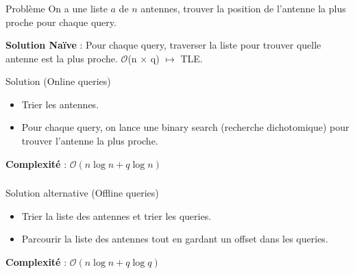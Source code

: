\begin{frame}
    \frametitle{\problemtitle}
    \begin{block}{Problème}
        On a une liste $a$ de $n$ antennes, trouver la position de l'antenne la plus proche pour chaque query.
    \end{block}
    \pause
    \textbf{Solution Naïve} : Pour chaque query, traverser la liste pour trouver quelle antenne est la plus proche.
    \pause
    $\mathcal{O}$(n $\times$ q) $\mapsto$ TLE.\\
    \pause \vspace{1em}
    \begin{block}{Solution (Online queries)}
        \begin{itemize}
            \item<+-> Trier les antennes.
            \item<+-> Pour chaque query, on lance une binary search (recherche dichotomique) pour trouver l'antenne la plus proche.
        \end{itemize}
        \pause
        \textbf{Complexité} : $\mathcal{O}(n \log n + q\log n)$
    \end{block}
\end{frame}

\begin{frame}
    \frametitle{\problemtitle}
    \begin{block}{Solution alternative (Offline queries)}
        \begin{itemize}
            \item Trier la liste des antennes et trier les queries.
            \item Parcourir la liste des antennes tout en gardant un offset dans les queries.
        \end{itemize}
        \pause
        \textbf{Complexité} : $\mathcal{O}(n \log n + q\log q)$
    \end{block}

    \solvestats
\end{frame}